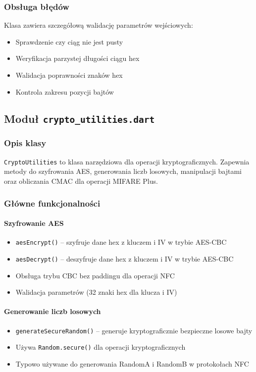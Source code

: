 \documentclass[a4paper,12pt]{article}
\begin{document}
\subsubsection{Obsługa błędów}
Klasa zawiera szczegółową walidację parametrów wejściowych:
\begin{itemize}
    \item Sprawdzenie czy ciąg nie jest pusty
    \item Weryfikacja parzystej długości ciągu hex
    \item Walidacja poprawności znaków hex
    \item Kontrola zakresu pozycji bajtów
\end{itemize}

\subsection{Moduł \texttt{crypto\_utilities.dart}}

\subsubsection{Opis klasy}
\texttt{CryptoUtilities} to klasa narzędziowa dla operacji kryptograficznych. Zapewnia metody do szyfrowania AES, generowania liczb losowych, manipulacji bajtami oraz obliczania CMAC dla operacji MIFARE Plus.

\subsubsection{Główne funkcjonalności}

\paragraph{Szyfrowanie AES}
\begin{itemize}
    \item \texttt{aesEncrypt()} -- szyfruje dane hex z kluczem i IV w trybie AES-CBC
    \item \texttt{aesDecrypt()} -- deszyfruje dane hex z kluczem i IV w trybie AES-CBC
    \item Obsługa trybu CBC bez paddingu dla operacji NFC
    \item Walidacja parametrów (32 znaki hex dla klucza i IV)
\end{itemize}

\paragraph{Generowanie liczb losowych}
\begin{itemize}
    \item \texttt{generateSecureRandom()} -- generuje kryptograficznie bezpieczne losowe bajty
    \item Używa \texttt{Random.secure()} dla operacji kryptograficznych
    \item Typowo używane do generowania RandomA i RandomB w protokołach NFC
\end{itemize}
\end{document}
